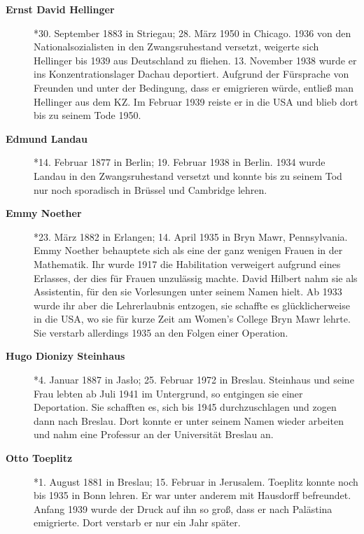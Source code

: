 \begin{description}
\item[\textbf{Ernst David Hellinger}] *30. September 1883 in Striegau; 28. März 1950 in Chicago. 1936 von den Nationalsozialisten in den Zwangsruhestand versetzt, weigerte sich Hellinger bis 1939 aus Deutschland zu fliehen. 13. November 1938 wurde er ins Konzentrationslager Dachau deportiert. Aufgrund der Fürsprache von Freunden und unter der Bedingung, dass er emigrieren würde, entließ man Hellinger aus dem KZ. Im Februar 1939 reiste er in die USA und blieb dort bis zu seinem Tode 1950.
\item[\textbf{Edmund Landau}] *14. Februar 1877 in Berlin; 19. Februar 1938 in Berlin. 1934 wurde Landau in den Zwangsruhestand versetzt und konnte bis zu seinem Tod nur noch sporadisch in Brüssel und Cambridge lehren. 
\item[\textbf{Emmy Noether}] *23. März 1882 in Erlangen; 14. April 1935 in Bryn Mawr, Pennsylvania. Emmy Noether behauptete sich als eine der ganz wenigen Frauen in der Mathematik. Ihr wurde 1917 die Habilitation verweigert aufgrund eines Erlasses, der dies für Frauen unzulässig machte. David Hilbert nahm sie als Assistentin, für den sie Vorlesungen unter seinem Namen hielt. Ab 1933 wurde ihr aber die Lehrerlaubnis entzogen, sie schaffte es glücklicherweise in die USA, wo sie für kurze Zeit am Women's College Bryn Mawr lehrte. Sie verstarb allerdings 1935 an den Folgen einer Operation.
\item[\textbf{Hugo Dionizy Steinhaus}] *4. Januar 1887 in Jas\l o; 25. Februar 1972 in Breslau. Steinhaus und seine Frau lebten ab Juli 1941 im Untergrund, so entgingen sie einer Deportation. Sie schafften es, sich bis 1945 durchzuschlagen und zogen dann nach Breslau. Dort konnte er unter seinem Namen wieder arbeiten und nahm eine Professur an der Universität Breslau an.
\item[\textbf{Otto Toeplitz}] *1. August 1881 in Breslau; 15. Februar in Jerusalem. Toeplitz konnte noch bis 1935 in Bonn lehren. Er war unter anderem mit Hausdorff befreundet. Anfang 1939 wurde der Druck auf ihn so groß, dass er nach Palästina emigrierte. Dort verstarb er nur ein Jahr später. 

\end{description}



